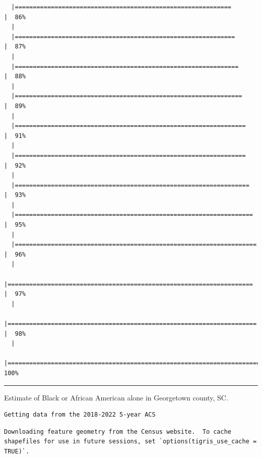 \documentclass[
  letterpaper,
  DIV=11,
  numbers=noendperiod]{scrartcl}
\begin{document}
\begin{verbatim}
  |============================================================          |  86%
  |                                                                            
  |=============================================================         |  87%
  |                                                                            
  |==============================================================        |  88%
  |                                                                            
  |===============================================================       |  89%
  |                                                                            
  |================================================================      |  91%
  |                                                                            
  |================================================================      |  92%
  |                                                                            
  |=================================================================     |  93%
  |                                                                            
  |==================================================================    |  95%
  |                                                                            
  |===================================================================   |  96%
  |                                                                            
  |====================================================================  |  97%
  |                                                                            
  |===================================================================== |  98%
  |                                                                            
  |======================================================================| 100%
\end{verbatim}

\begin{center}\rule{0.5\linewidth}{0.5pt}\end{center}

Estimate of Black or African American alone in Georgetown county, SC.

\begin{verbatim}
Getting data from the 2018-2022 5-year ACS
\end{verbatim}

\begin{verbatim}
Downloading feature geometry from the Census website.  To cache shapefiles for use in future sessions, set `options(tigris_use_cache = TRUE)`.
\end{verbatim}
\end{document}
